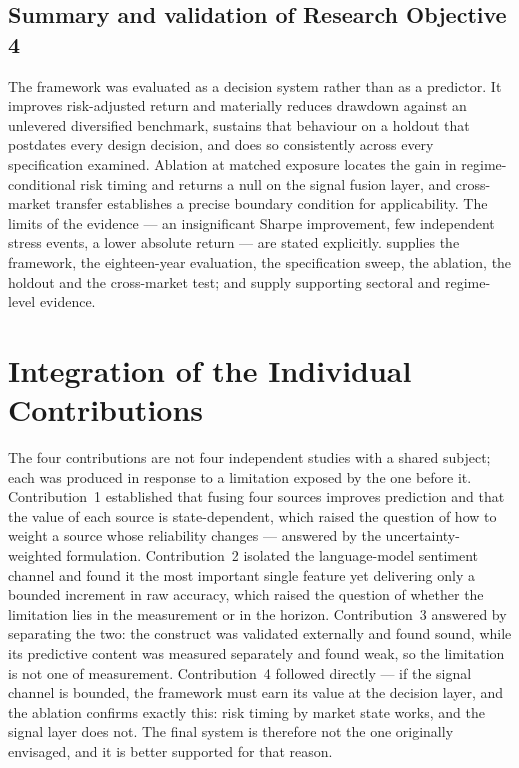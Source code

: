 \subsection{Summary and validation of Research Objective 4}

The framework was evaluated as a decision system rather than as a predictor. It improves
risk-adjusted return and materially reduces drawdown against an unlevered diversified benchmark,
sustains that behaviour on a holdout that postdates every design decision, and does so
consistently across every specification examined. Ablation at matched exposure locates the gain
in regime-conditional risk timing and returns a null on the signal fusion layer, and cross-market
transfer establishes a precise boundary condition for applicability. The limits of the evidence
--- an insignificant Sharpe improvement, few independent stress events, a lower absolute return
--- are stated explicitly.  supplies the framework, the eighteen-year evaluation, the
specification sweep, the ablation, the holdout and the cross-market test;  and
 supply supporting sectoral and regime-level evidence.

\section{Integration of the Individual Contributions}

The four contributions are not four independent studies with a shared subject; each was produced
in response to a limitation exposed by the one before it. Contribution~1 established that fusing
four sources improves prediction and that the value of each source is state-dependent, which
raised the question of how to weight a source whose reliability changes --- answered by the
uncertainty-weighted formulation. Contribution~2 isolated the language-model sentiment channel
and found it the most important single feature yet delivering only a bounded increment in raw
accuracy, which raised the question of whether the limitation lies in the measurement or in the
horizon. Contribution~3 answered by separating the two: the construct was validated externally
and found sound, while its predictive content was measured separately and found weak, so the
limitation is not one of measurement. Contribution~4 followed directly --- if the signal channel
is bounded, the framework must earn its value at the decision layer, and the ablation confirms
exactly this: risk timing by market state works, and the signal layer does not. The final system
is therefore not the one originally envisaged, and it is better supported for that reason.
